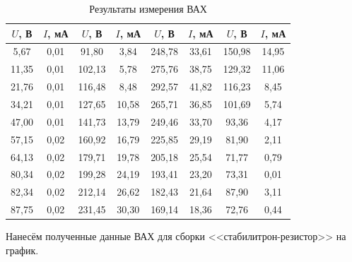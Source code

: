 \documentclass[a4paper,12pt]{article} %
\begin{document}
\begin{table}[H]
	\centering
	\begin{tabular}{|c|c|c|c|c|c|c|c|}
		\hline
		$ U $, В     & $ I $, мА    & $ U $, В     & $ I $, мА     & $ U $, В     & $ I $, мА     & $ U $, В     & $ I $, мА     \\ \hline
		5,67  & 0,01 & 91,80  & 3,84  & 248,78 & 33,61 & 150,98 & 14,95 \\ \hline
		11,35 & 0,01 & 102,13 & 5,78  & 275,76 & 38,75 & 129,32 & 11,06 \\ \hline
		21,76 & 0,01 & 116,48 & 8,48  & 292,57 & 41,82 & 116,23 & 8,45  \\ \hline
		34,21 & 0,01 & 127,65 & 10,58 & 265,71 & 36,85 & 101,69 & 5,74  \\ \hline
		47,00 & 0,01 & 141,73 & 13,79 & 249,46 & 33,70 & 93,36  & 4,17  \\ \hline
		57,15 & 0,02 & 160,92 & 16,79 & 225,85 & 29,19 & 81,90  & 2,11  \\ \hline
		64,13 & 0,02 & 179,71 & 19,78 & 205,18 & 25,54 & 71,77  & 0,79  \\ \hline
		80,34 & 0,02 & 199,28 & 24,19 & 193,41 & 23,20 & 73,31  & 0,01  \\ \hline
		82,34 & 0,02 & 212,14 & 26,62 & 182,43 & 21,64 & 87,90  & 3,11  \\ \hline
		87,75 & 0,02 & 231,45 & 30,30 & 169,14 & 18,36 & 72,76  & 0,44  \\ \hline
	\end{tabular}
	\caption{Результаты измерения ВАХ}
	\label{tab:tab1}
\end{table}

Нанесём полученные данные ВАХ для сборки <<стабилитрон-резистор>> на график.
\end{document}
